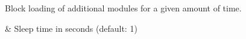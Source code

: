 Block loading of additional modules for a given amount of time.

\begin{tscattributes}
   & Sleep time in seconds (default: 1) \\
\end{tscattributes}
